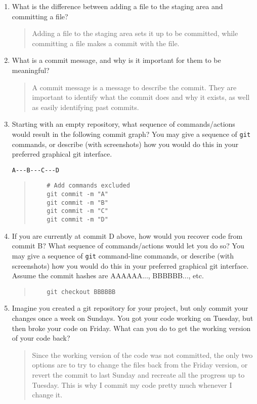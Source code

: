 \documentclass[10pt,twocolumn]{article}
\begin{document}
\begin{enumerate}
\item What is the difference between adding a file to the staging area and committing a file?
    \begin{quote}
        Adding a file to the staging area sets it up to be committed, while
        committing a file makes a commit with the file.
    \end{quote}
\item What is a commit message, and why is it important for them to be meaningful?
    \begin{quote}
        A commit message is a message to describe the commit. They are important
        to identify what the commit does and why it exists, as well as easily
        identifying past commits.
    \end{quote}
\item Starting with an empty repository, what sequence of commands/actions would result in the following commit graph? You may give a sequence of \texttt{git} commands, or describe (with screenshots) how you would do this in your preferred graphical git interface.
\begin{verbatim}
A---B---C---D
\end{verbatim}
\begin{quote}
    \begin{verbatim}
    # Add commands excluded
    git commit -m "A"
    git commit -m "B"
    git commit -m "C"
    git commit -m "D"
    \end{verbatim}
\end{quote}
\item If you are currently at commit D above, how would you recover code from commit B? What sequence of commands/actions would let you do so? You may give a sequence of \texttt{git} command-line commands, or describe (with screenshots) how you would do this in your preferred graphical git interface. Assume the commit hashes are AAAAAA..., BBBBBB..., etc.
\begin{quote}
    \begin{verbatim}
    git checkout BBBBBB
    \end{verbatim}
\end{quote}
\item Imagine you created a git repository for your project, but only commit your changes once a week on Sundays. You got your code working on Tuesday, but then broke your code on Friday. What can you do to get the working version of your code back?
    \begin{quote}
        Since the working version of the code was not committed,
        the only two options are to try to change the files back from the Friday
        version, or revert the commit to last Sunday and recreate all the
        progress up to Tuesday. This is why I commit my code pretty much
        whenever I change it.
    \end{quote}
\end{enumerate}
\end{document}
